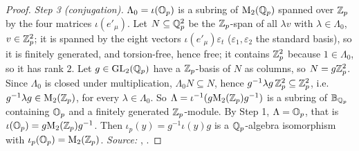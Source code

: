 \begin{proof}
\emph{Step 3 (conjugation).} $\Lambda_0=\iota(\mathbb{O}_p)$ is a subring of $\mathrm{M}_2(\mathbb{Q}_p)$ spanned over $\mathbb{Z}_p$ by the four matrices $\iota(e'_\mu)$. Let
$N\subseteq\mathbb{Q}_p^2$ be the $\mathbb{Z}_p$-span of all $\lambda v$ with $\lambda\in\Lambda_0$, $v\in\mathbb{Z}_p^2$; it is spanned by the eight vectors $\iota(e'_\mu)\varepsilon_t$
($\varepsilon_1,\varepsilon_2$ the standard basis), so it is finitely generated, and torsion-free, hence free; it contains $\mathbb{Z}_p^2$ because $1\in\Lambda_0$, so it
has rank $2$. Let $g\in\mathrm{GL}_2(\mathbb{Q}_p)$ have a $\mathbb{Z}_p$-basis of $N$ as columns, so $N=g\mathbb{Z}_p^2$. Since $\Lambda_0$ is closed under multiplication,
$\Lambda_0N\subseteq N$, hence $g^{-1}\lambda g\,\mathbb{Z}_p^2\subseteq\mathbb{Z}_p^2$, i.e.\ $g^{-1}\lambda g\in\mathrm{M}_2(\mathbb{Z}_p)$, for every $\lambda\in\Lambda_0$. So
$\Lambda=\iota^{-1}(g\mathrm{M}_2(\mathbb{Z}_p)g^{-1})$ is a subring of $\mathbb{B}_{\mathbb{Q}_p}$ containing $\mathbb{O}_p$ and a finitely generated $\mathbb{Z}_p$-module. By Step 1,
$\Lambda=\mathbb{O}_p$, that is $\iota(\mathbb{O}_p)=g\mathrm{M}_2(\mathbb{Z}_p)g^{-1}$. Then $\iota_p(y)=g^{-1}\iota(y)g$ is a $\mathbb{Q}_p$-algebra isomorphism with
$\iota_p(\mathbb{O}_p)=\mathrm{M}_2(\mathbb{Z}_p)$. \emph{Source:} \cite[§10.5]{Voi}, \cite[Prop.~1.1, p.~344]{Piz}.
\end{proof}

